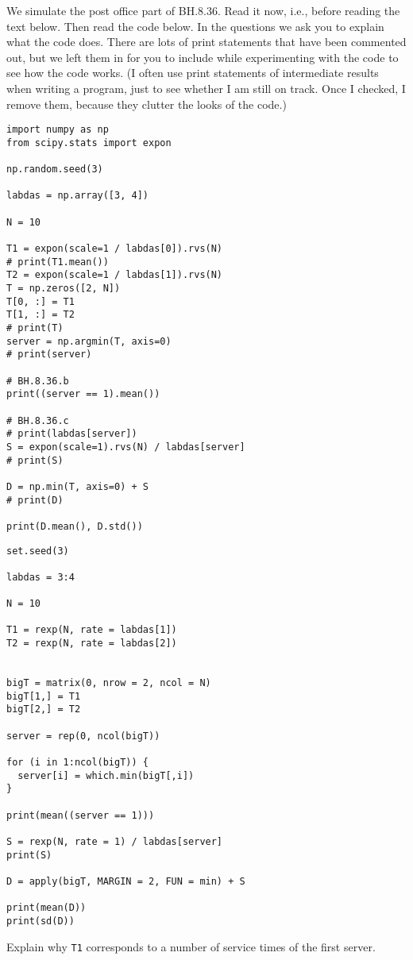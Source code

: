 We simulate the post office part of BH.8.36.
Read it now, i.e., before reading the text below.
Then read the code below.
In the questions we ask you to explain what the code does.
There are lots of print statements that have been commented out, but we left them in for you to include while experimenting with the code to see how the code works.
(I often use print statements of intermediate results when writing a program, just to see whether I am still on track.
Once I checked, I remove them, because they clutter the looks of the code.)

\begin{verbatim}
import numpy as np
from scipy.stats import expon

np.random.seed(3)

labdas = np.array([3, 4])

N = 10

T1 = expon(scale=1 / labdas[0]).rvs(N)
# print(T1.mean())
T2 = expon(scale=1 / labdas[1]).rvs(N)
T = np.zeros([2, N])
T[0, :] = T1
T[1, :] = T2
# print(T)
server = np.argmin(T, axis=0)
# print(server)

# BH.8.36.b
print((server == 1).mean())

# BH.8.36.c
# print(labdas[server])
S = expon(scale=1).rvs(N) / labdas[server]
# print(S)

D = np.min(T, axis=0) + S
# print(D)

print(D.mean(), D.std())
\end{verbatim}

\begin{verbatim}
set.seed(3)

labdas = 3:4

N = 10

T1 = rexp(N, rate = labdas[1])
T2 = rexp(N, rate = labdas[2])


bigT = matrix(0, nrow = 2, ncol = N)
bigT[1,] = T1
bigT[2,] = T2

server = rep(0, ncol(bigT))

for (i in 1:ncol(bigT)) {
  server[i] = which.min(bigT[,i])
}

print(mean((server == 1)))

S = rexp(N, rate = 1) / labdas[server]
print(S)

D = apply(bigT, MARGIN = 2, FUN = min) + S

print(mean(D))
print(sd(D))
\end{verbatim}

\begin{exercise}
Explain why  \texttt{T1} corresponds to a number of service times of the first server.
\end{exercise}

